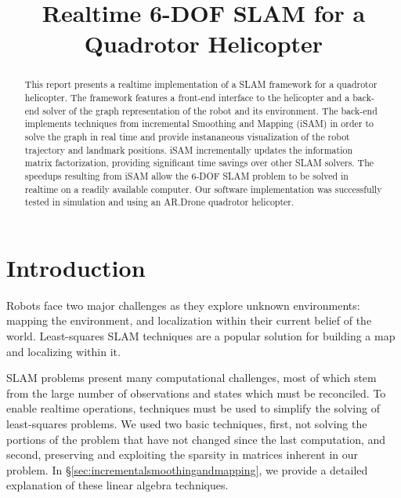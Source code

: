 \documentclass[conference]{IEEEtran}
\title{Realtime 6-DOF SLAM for a Quadrotor Helicopter}
\author{\IEEEauthorblockN{Stephen Chaves}
  \and
  \IEEEauthorblockN{Schuyler Cohen}
  \and
  \IEEEauthorblockN{Patrick O'Keefe}
  \and
  \IEEEauthorblockN{Paul Ozog}}
\begin{document}
\maketitle



\begin{abstract}

  This report presents a realtime implementation of a \ac{SLAM} framework for a quadrotor
  helicopter.  The framework features a front-end interface to the helicopter and a
  back-end solver of the graph representation of the robot and its environment. The
  back-end implements techniques from incremental Smoothing and Mapping (iSAM) in order to
  solve the graph in real time and provide instananeous visualization of the robot
  trajectory and landmark positions. iSAM incrementally updates the information matrix
  factorization, providing significant time savings over other \ac{SLAM} solvers. The speedups
  resulting from iSAM allow the 6-\ac{DOF} \ac{SLAM} problem to be solved in realtime on a readily
  available computer. Our software implementation was successfully tested in simulation
  and using an AR.Drone quadrotor helicopter.

\end{abstract}






\section{Introduction}
\label{sec:introduction}

Robots face two major challenges as they explore unknown environments: mapping the
environment, and localization within their current belief of the world.  Least-squares
\ac{SLAM} techniques are a popular solution for building a map and localizing within it.

\ac{SLAM} problems present many computational challenges, most of which stem from the
large number of observations and states which must be reconciled.  To enable realtime
operations, techniques must be used to simplify the solving of least-squares problems. We
used two basic techniques, first, not solving the portions of the problem that have not
changed since the last computation, and second, preserving and exploiting the sparsity in
matrices inherent in our problem.  In \S\ref{sec:incrementalsmoothingandmapping}, we
provide a detailed explanation of these linear algebra techniques.
 
\end{document}
